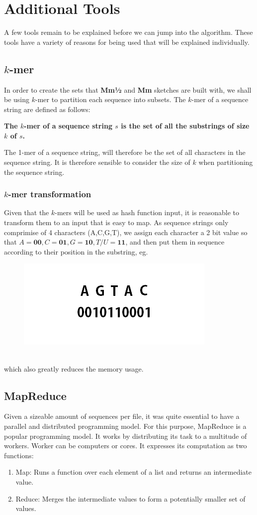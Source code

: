 \documentclass[../../main.tex]{subfiles}
\begin{document}
\section{Additional Tools}
A few tools remain to be explained before we can jump into the algorithm. These tools have a variety of reasons for being used that will be explained individually. 
\subsection{$k$-mer}
In order to create the sets that {\bf Mm½} and {\bf Mm} sketches are built with, we shall be using $k$-mer to partition each sequence into subsets. The $k$-mer of a sequence string are defined as follows:
\begin{center}
{\bf The $k$-mer of a sequence string $s$ is the set of all the substrings of size $k$ of $s$.}
\end{center}
The 1-mer of a sequence string, will therefore be the set of all characters in the sequence string. It is therefore sensible to consider the size of $k$ when partitioning the sequence string.
\subsubsection{$k$-mer transformation}
Given that the $k$-mers will be used as hash function input, it is reasonable to transform them to an input that is easy to map. As sequence strings only comprimise of 4 characters (A,C,G,T), we assign each character a 2 bit value so that $A=\mathbf{00},C=\mathbf{01},G=\mathbf{10},T/U=\mathbf{11}$, and then put them in sequence according to their position in the substring, eg.
\begin{figure}[h]
\includegraphics[scale=0.4]{fig/kmertransformed}
\end{figure}\\
which also greatly reduces the memory usage.
\subsection{MapReduce}
Given a sizeable amount of sequences per file, it was quite essential to have a parallel and distributed programming model. For this purpose, MapReduce is a popular programming model. It works by distributing its task to a multitude of workers. Worker can be computers or cores. It expresses its computation as two functions:
\begin{enumerate}
\item Map: Runs a function over each element of a list and returns an intermediate value.
\item Reduce: Merges the intermediate values to form a potentially smaller set of values.
\end{enumerate}
\end{document}
